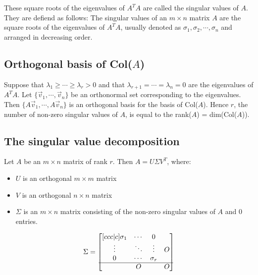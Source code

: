 \documentclass[11pt, a4paper]{article}
\begin{document}
These square roots of the eigenvalues of $A^TA$ are called the singular values of $A$. They are defiend as follows: The singular values of an $m \times n$ matrix $A$ are the square roots of the eigenvalues of $A^TA$, usually denoted as $\sigma_1, \sigma_2, \cdots, \sigma_n$ and arranged in decreasing order.



\subsection{Orthogonal basis of Col($A$)}
Suppose that $\lambda_1 \geq \cdots \geq \lambda_r > 0$ and that $\lambda_{r+1} = \cdots = \lambda_n = 0$ are the eigenvalues of$A^TA$. Let $\{\vec{v}_1, \cdots, \vec{v}_n \}$ be an orthonormal set corresponding to the eigenvalues. Then $\{A\vec{v}_1, \cdots, A\vec{v}_n \}$ is an orthogonal basis for the basis of Col($A$). Hence $r$, the number of non-zero singular values of $A$, is equal to the rank($A$) = dim(Col($A$)).



\subsection{The singular value decomposition}
Let $A$ be an $m \times n$ matrix of rank $r$. Then $A = U\Sigma V^T$, where:

\begin{itemize}
	\item $U$ is an orthogonal $m \times m$ matrix
	\item $V$ is an orthogonal $n \times n$ matrix
	\item $\Sigma$ is an $m \times n$ matrix consisting of the non-zero singular values of $A$ and $0$ entries.
\end{itemize}

\begin{equation}
	\Sigma = 
	\begin{bmatrix}[ccc|c]
		\sigma_1 & \cdots & 0 & \\
		\vdots & \ddots & \vdots & O\\
		0 & \cdots & \sigma_r & \\
		\hline
		& O & & O
	\end{bmatrix}
\end{equation}
\end{document}
